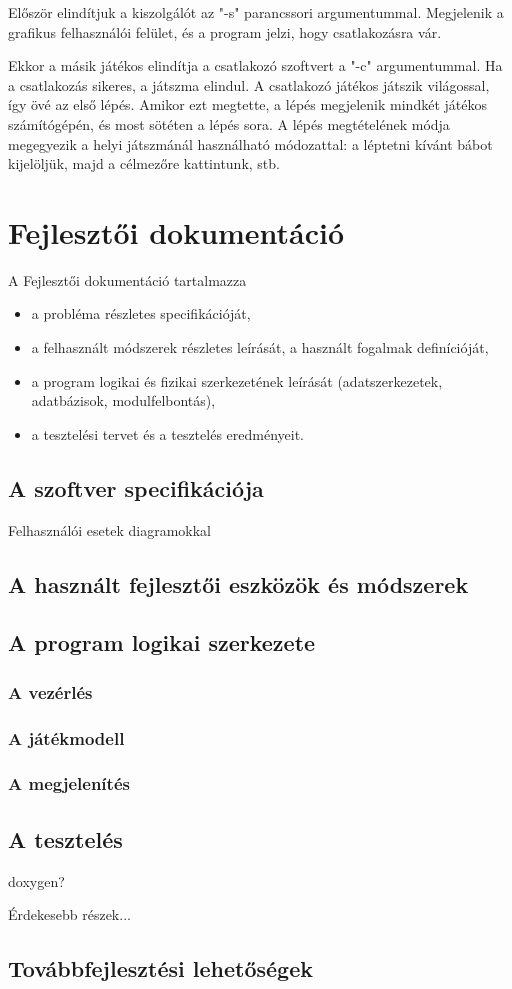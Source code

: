 \documentclass[12pt, twoside]{report}
\begin{document}
Először elindítjuk a kiszolgálót az "-s" parancssori argumentummal. Megjelenik a grafikus felhasználói felület, és a program jelzi, hogy csatlakozásra vár.

Ekkor a másik játékos elindítja a csatlakozó szoftvert a "-c" argumentummal. Ha a csatlakozás sikeres, a játszma elindul. A csatlakozó játékos játszik világossal, így övé az első lépés. Amikor ezt megtette, a lépés megjelenik mindkét játékos számítógépén, és most sötéten a lépés sora. A lépés megtételének módja megegyezik a helyi játszmánál használható módozattal: a léptetni kívánt bábot kijelöljük, majd a célmezőre kattintunk, stb.

\chapter{Fejlesztői dokumentáció}

A Fejlesztői dokumentáció tartalmazza 
\begin{itemize}
\item a probléma részletes specifikációját, 
\item a felhasznált módszerek részletes leírását, a használt fogalmak definícióját,
\item a program logikai és fizikai szerkezetének leírását (adatszerkezetek, adatbázisok, modulfelbontás),
\item a tesztelési tervet és a tesztelés eredményeit.
\end{itemize}

\section{A szoftver specifikációja}
Felhasználói esetek diagramokkal

\section{A használt fejlesztői eszközök és módszerek}

\section{A program logikai szerkezete}

\subsection{A vezérlés}

\subsection {A játékmodell}

\subsection{A megjelenítés}

\section{A tesztelés}

doxygen?

Érdekesebb részek...

\section{Továbbfejlesztési lehetőségek}
\end{document}
